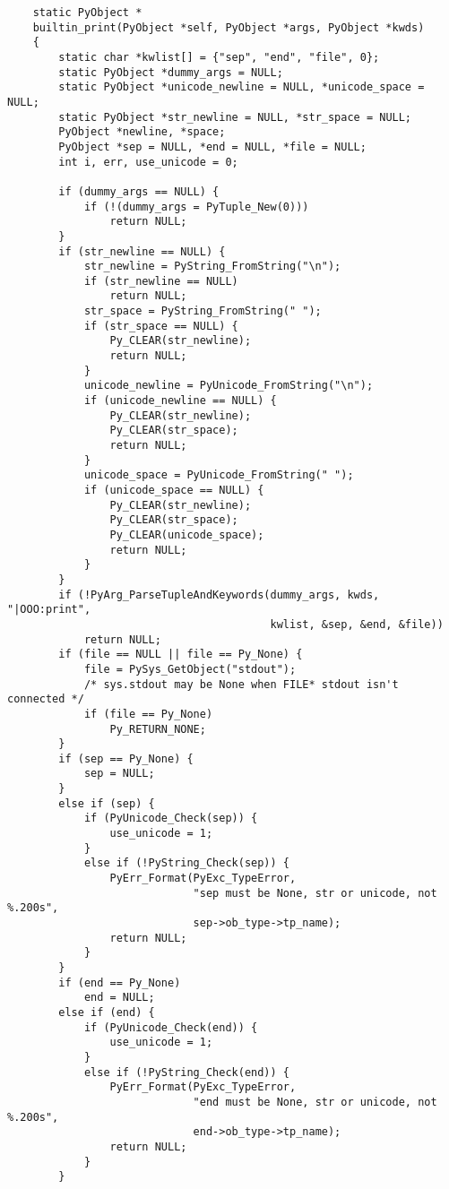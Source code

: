 \begin{verbatim}
	static PyObject *
	builtin_print(PyObject *self, PyObject *args, PyObject *kwds)
	{
	    static char *kwlist[] = {"sep", "end", "file", 0};
	    static PyObject *dummy_args = NULL;
	    static PyObject *unicode_newline = NULL, *unicode_space = NULL;
	    static PyObject *str_newline = NULL, *str_space = NULL;
	    PyObject *newline, *space;
	    PyObject *sep = NULL, *end = NULL, *file = NULL;
	    int i, err, use_unicode = 0;

	    if (dummy_args == NULL) {
	        if (!(dummy_args = PyTuple_New(0)))
	            return NULL;
	    }
	    if (str_newline == NULL) {
	        str_newline = PyString_FromString("\n");
	        if (str_newline == NULL)
	            return NULL;
	        str_space = PyString_FromString(" ");
	        if (str_space == NULL) {
	            Py_CLEAR(str_newline);
	            return NULL;
	        }
	        unicode_newline = PyUnicode_FromString("\n");
	        if (unicode_newline == NULL) {
	            Py_CLEAR(str_newline);
	            Py_CLEAR(str_space);
	            return NULL;
	        }
	        unicode_space = PyUnicode_FromString(" ");
	        if (unicode_space == NULL) {
	            Py_CLEAR(str_newline);
	            Py_CLEAR(str_space);
	            Py_CLEAR(unicode_space);
	            return NULL;
	        }
	    }
	    if (!PyArg_ParseTupleAndKeywords(dummy_args, kwds, "|OOO:print",
	                                     kwlist, &sep, &end, &file))
	        return NULL;
	    if (file == NULL || file == Py_None) {
	        file = PySys_GetObject("stdout");
	        /* sys.stdout may be None when FILE* stdout isn't connected */
	        if (file == Py_None)
	            Py_RETURN_NONE;
	    }
	    if (sep == Py_None) {
	        sep = NULL;
	    }
	    else if (sep) {
	        if (PyUnicode_Check(sep)) {
	            use_unicode = 1;
	        }
	        else if (!PyString_Check(sep)) {
	            PyErr_Format(PyExc_TypeError,
	                         "sep must be None, str or unicode, not %.200s",
	                         sep->ob_type->tp_name);
	            return NULL;
	        }
	    }
	    if (end == Py_None)
	        end = NULL;
	    else if (end) {
	        if (PyUnicode_Check(end)) {
	            use_unicode = 1;
	        }
	        else if (!PyString_Check(end)) {
	            PyErr_Format(PyExc_TypeError,
	                         "end must be None, str or unicode, not %.200s",
	                         end->ob_type->tp_name);
	            return NULL;
	        }
	    }


\end{verbatim}
